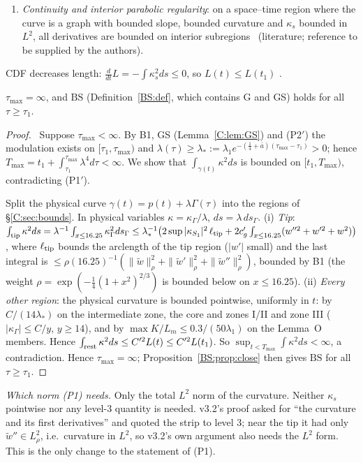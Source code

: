 \documentclass[11pt]{article}
\begin{document}
\begin{enumerate}[label=(P\arabic*$'$),leftmargin=3em]
\item \emph{Continuity and interior parabolic regularity}: on a space--time region where the curve is a graph with bounded slope, bounded curvature and $\kappa_s$ bounded in $L^2$, all derivatives are bounded on interior subregions \tH\ (literature; reference to be supplied by the authors).
\end{enumerate}
CDF decreases length: $\frac{d}{dt}L=-\int\kappa_s^2ds\le0$, so $L(t)\le L(t_1)$ \tP.

\begin{proposition}\label{C:prop:global}
$\tau_{\max}=\infty$, and $\mathrm{BS}$ (Definition~\ref{BS:def}, which contains G and GS) holds for all $\tau\ge\tau_1$.
\end{proposition}
\begin{proof}\tP\ Suppose $\tau_{\max}<\infty$. By B1, GS (Lemma~\ref{C:lem:GS}) and (P2$'$) the modulation exists on $[\tau_1,\tau_{\max})$ and $\lambda(\tau)\ge\lambda_*:=\lambda_1e^{-(\frac14+\bar a)(\tau_{\max}-\tau_1)}>0$; hence $T_{\max}=t_1+\int_{\tau_1}^{\tau_{\max}}\lambda^4d\tau<\infty$. We show that $\int_{\gamma(t)}\kappa^2ds$ is bounded on $[t_1,T_{\max})$, contradicting (P1$'$).

Split the physical curve $\gamma(t)=p(t)+\lambda\Gamma(\tau)$ into the regions of \S\ref{C:sec:bounds}. In physical variables $\kappa=\kappa_\Gamma/\lambda$, $ds=\lambda\,ds_\Gamma$.
(i) \emph{Tip}: $\int_{\rm tip}\kappa^2ds=\lambda^{-1}\int_{x\le16.25}\kappa_\Gamma^2ds_\Gamma\le\lambda_*^{-1}\bigl(2\sup|\kappa_{S_1}|^2\,\ell_{\rm tip}+2c_g'\int_{x\le16.25}(w''^2+w'^2+w^2)\bigr)$, where $\ell_{\rm tip}$ bounds the arclength of the tip region ($|w'|$ small) and the last integral is $\le\rho(16.25)^{-1}(\|\tilde w\|_\rho^2+\|\tilde w'\|_\rho^2+\|\tilde w''\|_\rho^2)$, bounded by B1 (the weight $\rho=\exp(-\frac14(1+x^2)^{2/3})$ is bounded below on $x\le16.25$).
(ii) \emph{Every other region}: the physical curvature is bounded pointwise, uniformly in $t$: by $C/(14\lambda_*)$ on the intermediate zone, the core and zones I/II and zone III ($|\kappa_\Gamma|\le C/y$, $y\ge14$), and by $\max K/L_m\le0.3/(50\lambda_1)$ on the Lemma~O members. Hence $\int_{\rm rest}\kappa^2ds\le C'^2L(t)\le C'^2L(t_1)$.
So $\sup_{t<T_{\max}}\int\kappa^2ds<\infty$, a contradiction. Hence $\tau_{\max}=\infty$; Proposition~\ref{BS:prop:close} then gives $\mathrm{BS}$ for all $\tau\ge\tau_1$.
\end{proof}
\noindent\emph{Which norm (P1) needs.} Only the total $L^2$ norm of the curvature. Neither $\kappa_s$ pointwise nor any level-3 quantity is needed. v3.2's proof asked for ``the curvature and its first derivatives'' and quoted the strip to level 3; near the tip it had only $\tilde w''\in L^2_\rho$, i.e.\ curvature in $L^2$, so v3.2's own argument also needs the $L^2$ form. This is the only change to the statement of (P1).
\end{document}
